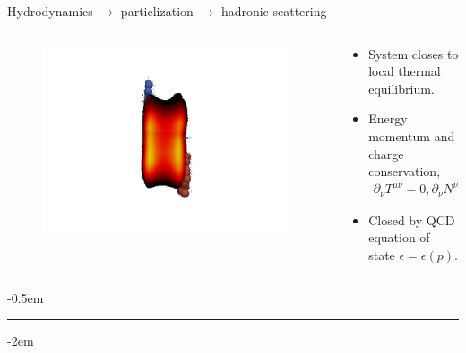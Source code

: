 \documentclass[11pt]{beamer}
\begin{document}
\begin{frame}{Hydrodynamics $\rightarrow$ particlization $\rightarrow$ hadronic scattering}

\begin{columns}[onlytextwidth]
  \begin{column}{0.2\textwidth}
    \begin{figure}
   	\begin{center}
   	\includegraphics[width=\textwidth]{pics/new100.png}
	\end{center} 	
  	\end{figure}
  \end{column}
  \begin{column}{0.8\textwidth}
  \begin{itemize}
  	\item System closes to local thermal equilibrium.
  	\item Energy momentum and charge conservation,
  	\begin{eqnarray}
  	{\partial}_\nu T^{\mu\nu} = 0, {\partial}_\nu N^{\nu} = 0.
  	\end{eqnarray}
  	\item Closed by QCD equation of state $\epsilon = \epsilon(p)$.
  \end{itemize}
  \end{column}
\end{columns}
\begin{center}
\kern-0.5em
\rule{11cm}{0.5pt}
\end{center}
\kern-2em
\begin{columns}[onlytextwidth]
  \begin{column}{0.85\textwidth}

\end{column}
\end{columns}
\end{frame}
\end{document}
